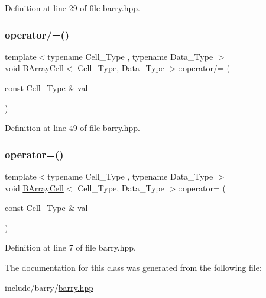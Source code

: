 Definition at line 29 of file barry.\+hpp.

\mbox{\label{classbarry_1_1_b_array_cell_aa5debb920d8ffc246e7d463ac8e26152}} 
\subsubsection{\texorpdfstring{operator/=()}{operator/=()}}
{\footnotesize\ttfamily template$<$typename Cell\+\_\+\+Type , typename Data\+\_\+\+Type $>$ \\
void \hyperlink{classbarry_1_1_b_array_cell}{B\+Array\+Cell}$<$ Cell\+\_\+\+Type, Data\+\_\+\+Type $>$\+::operator/= (\begin{DoxyParamCaption}\item[{const Cell\+\_\+\+Type \&}]{val }\end{DoxyParamCaption})\hspace{0.3cm}{\ttfamily [inline]}}



Definition at line 49 of file barry.\+hpp.

\mbox{\label{classbarry_1_1_b_array_cell_ad20091ef5961aed4241bd8d0b6d5dd0d}} 
\subsubsection{\texorpdfstring{operator=()}{operator=()}}
{\footnotesize\ttfamily template$<$typename Cell\+\_\+\+Type , typename Data\+\_\+\+Type $>$ \\
void \hyperlink{classbarry_1_1_b_array_cell}{B\+Array\+Cell}$<$ Cell\+\_\+\+Type, Data\+\_\+\+Type $>$\+::operator= (\begin{DoxyParamCaption}\item[{const Cell\+\_\+\+Type \&}]{val }\end{DoxyParamCaption})\hspace{0.3cm}{\ttfamily [inline]}}



Definition at line 7 of file barry.\+hpp.



The documentation for this class was generated from the following file\+:\begin{DoxyCompactItemize}
\item 
include/barry/\hyperlink{barry_8hpp}{barry.\+hpp}\end{DoxyCompactItemize}

